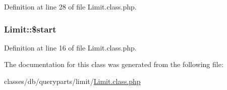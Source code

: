 Definition at line 28 of file Limit.\+class.\+php.

\hypertarget{classLimit_a58e5f9abf39a412a992c922b3342d093}{
\subsubsection[{\$start}]{\setlength{\rightskip}{0pt plus 5cm}Limit\+::\$start}}\label{classLimit_a58e5f9abf39a412a992c922b3342d093}


Definition at line 16 of file Limit.\+class.\+php.



The documentation for this class was generated from the following file\+:\begin{DoxyCompactItemize}
\item 
classes/db/queryparts/limit/\hyperlink{Limit_8class_8php}{Limit.\+class.\+php}\end{DoxyCompactItemize}
